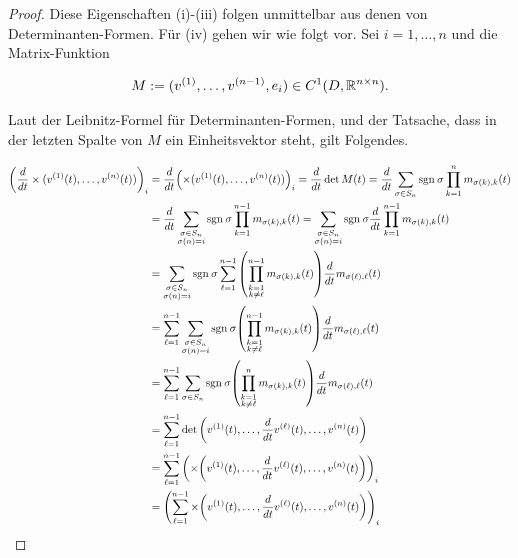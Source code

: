 \begin{proof}

Diese Eigenschaften (i)-(iii) folgen unmittelbar aus denen von Determinanten-Formen.
Für (iv) gehen wir wie folgt vor.
Sei $i = 1, \ldots, n$ und die Matrix-Funktion

\begin{align*}
  M := (v^{(1)}, \ldots, v^{(n-1)}, e_i)
  \in C^1(D, \mathbb{R}^{n \times n}).
\end{align*}

Laut der Leibnitz-Formel für Determinanten-Formen, und der Tatsache, dass in der letzten Spalte von $M$ ein Einheitsvektor steht, gilt Folgendes.

\begin{align*}
  {\left ( 
    \frac{d}{dt}
    \times(v^{(1)}(t), \ldots, v^{(n)}(t))
   \right )}_i
  & =
  \frac{d}{dt}
  {\left ( 
    \times(v^{(1)}(t), \ldots, v^{(n)}(t))
   \right )}_i
  =
  \frac{d}{dt}
  \det{M(t)}
  =
  \frac{d}{dt}
  \sum_{\sigma \in S_n}
  \mathrm{sgn} \: \sigma
  \prod_{k=1}^n
  m_{\sigma(k), k}(t) \\
  & =
  \frac{d}{dt}
  \sum_{\substack{\sigma \in S_n \\ \sigma(n) = i}}
  \mathrm{sgn} \: \sigma
  \prod_{k=1}^{n-1}
  m_{\sigma(k), k}(t)
  =
  \sum_{\substack{\sigma \in S_n \\ \sigma(n) = i}}
  \mathrm{sgn} \: \sigma
  \frac{d}{dt}
  \prod_{k=1}^{n-1}
  m_{\sigma(k), k}(t) \\
  & =
  \sum_{\substack{\sigma \in S_n \\ \sigma(n) = i}}
  \mathrm{sgn} \: \sigma
  \sum_{\ell = 1}^{n-1}
  {\left ( 
    \prod_{\substack{k=1 \\ k \neq \ell}}^{n-1}
    m_{\sigma(k), k}(t)
   \right )}
  \frac{d}{dt}
  m_{\sigma(\ell), \ell}(t) \\
  & =
  \sum_{\ell = 1}^{n-1}
  \sum_{\substack{\sigma \in S_n \\ \sigma(n) = i}}
  \mathrm{sgn} \: \sigma
  {\left ( 
    \prod_{\substack{k=1 \\ k \neq \ell}}^{n-1}
    m_{\sigma(k), k}(t)
   \right )}
  \frac{d}{dt}
  m_{\sigma(\ell), \ell}(t) \\
  & =
  \sum_{\ell = 1}^{n-1}
  \sum_{\sigma \in S_n}
  \mathrm{sgn} \: \sigma
  {\left ( 
    \prod_{\substack{k=1 \\ k \neq \ell}}^n
    m_{\sigma(k), k}(t)
   \right )}
  \frac{d}{dt}
  m_{\sigma(\ell), \ell}(t) \\
  & =
  \sum_{\ell = 1}^{n-1}
  \det {\left ( 
    v^{(1)}(t),
    \ldots,
    \frac{d}{dt}
    v^{(\ell)}(t),
    \ldots,
    v^{(n)}(t)
   \right )} \\
  & =
  \sum_{\ell = 1}^{n-1}
  {\left ( 
    \times {\left ( 
    v^{(1)}(t),
    \ldots,
    \frac{d}{dt}
    v^{(\ell)}(t),
    \ldots,
    v^{(n)}(t)
     \right )}
   \right )}_i \\
  & =
  {\left ( 
    \sum_{\ell = 1}^{n-1}
    \times {\left ( 
    v^{(1)}(t),
    \ldots,
    \frac{d}{dt}
    v^{(\ell)}(t),
    \ldots,
    v^{(n)}(t)
     \right )}
   \right )}_i
\end{align*}

\end{proof}
